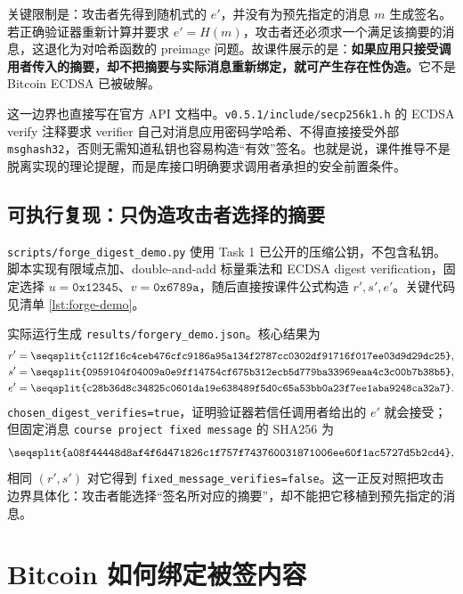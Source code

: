 \documentclass[11pt,a4paper,fontset=none]{ctexart}
\begin{document}
关键限制是：攻击者先得到随机式的 $e'$，并没有为预先指定的消息 $m$ 生成签名。若正确验证器重新计算并要求 $e'=H(m)$，攻击者还必须求一个满足该摘要的消息，这退化为对哈希函数的 preimage 问题。故课件展示的是：\textbf{如果应用只接受调用者传入的摘要，却不把摘要与实际消息重新绑定，就可产生存在性伪造。}它不是 Bitcoin ECDSA 已被破解。

这一边界也直接写在官方 API 文档中。\texttt{v0.5.1/include/secp256k1.h} 的 ECDSA verify 注释要求 verifier 自己对消息应用密码学哈希、不得直接接受外部 \texttt{msghash32}，否则无需知道私钥也容易构造“有效”签名。也就是说，课件推导不是脱离实现的理论提醒，而是库接口明确要求调用者承担的安全前置条件。

\subsection{可执行复现：只伪造攻击者选择的摘要}

\texttt{scripts/forge\_digest\_demo.py} 使用 Task 1 已公开的压缩公钥，不包含私钥。脚本实现有限域点加、double-and-add 标量乘法和 ECDSA digest verification，固定选择 $u=\texttt{0x12345}$、$v=\texttt{0x6789a}$，随后直接按课件公式构造 $r',s',e'$。关键代码见清单 \ref{lst:forge-demo}。



实际运行生成 \texttt{results/forgery\_demo.json}。核心结果为
\begin{align*}
r'&=\texttt{\seqsplit{c112f16c4ceb476cfc9186a95a134f2787cc0302df91716f017ee03d9d29dc25}},\\
s'&=\texttt{\seqsplit{0959104f04009a0e9ff14754cf675b312ecb5d779ba33969eaa4c3c00b7b38b5}},\\
e'&=\texttt{\seqsplit{c28b36d8c34825c0601da19e638489f5d0c65a53bb0a23f7ee1aba9248ca32a7}}.
\end{align*}
\texttt{chosen\_digest\_verifies=true}，证明验证器若信任调用者给出的 $e'$ 就会接受；但固定消息 \texttt{course project fixed message} 的 SHA256 为
\[
\texttt{\seqsplit{a08f44448d8af4f6d471826c1f757f743760031871006ee60f1ac5727d5b2cd4}},
\]
相同 $(r',s')$ 对它得到 \texttt{fixed\_message\_verifies=false}。这一正反对照把攻击边界具体化：攻击者能选择“签名所对应的摘要”，却不能把它移植到预先指定的消息。

\section{Bitcoin 如何绑定被签内容}
\end{document}
